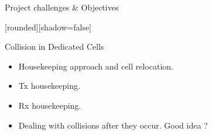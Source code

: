 \begin{withoutheadline}
\begin{frame}{Project challenges \& Objectives}


[rounded][shadow=false]
\begin{minipage}[t]{0.48\linewidth}

\begin{block}{Collision in Dedicated Cells}
    \begin{itemize}
    \item Housekeeping approach and cell relocation.
    \item<2-> Tx housekeeping. 
    \item<5-> Rx housekeeping. 
    \item<7-> Dealing with collisions after they occur. Good idea ?
    

\end{itemize}
\end{block}
\end{minipage}
\end{frame}
\end{withoutheadline}
